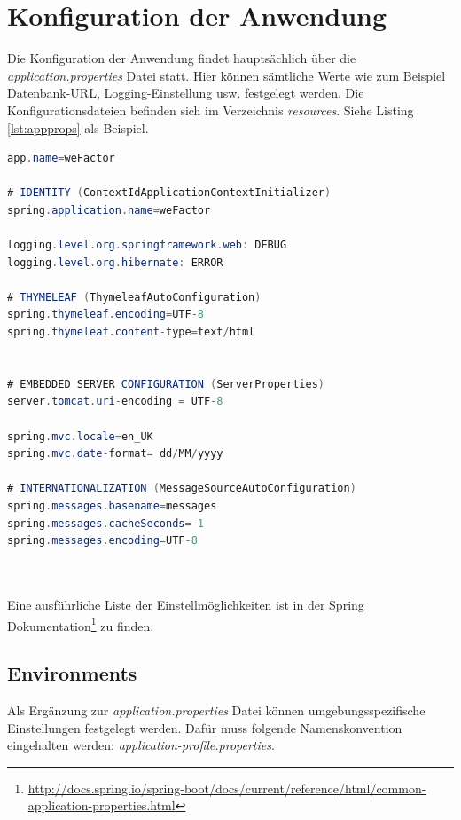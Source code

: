 
\thispagestyle{plain}

\chapter{Konfiguration der Anwendung}\label{c_config}
Die Konfiguration der Anwendung findet hauptsächlich über die \emph{application.properties} Datei statt. Hier können sämtliche Werte wie zum Beispiel Datenbank-URL, Logging-Einstellung usw. festgelegt werden. Die Konfigurationsdateien befinden sich im Verzeichnis \emph{resources}. Siehe Listing \ref{lst:appprops} als Beispiel.

   \begin{lstlisting}[caption={application.properties},label={lst:appprops},language=Java]
app.name=weFactor

# IDENTITY (ContextIdApplicationContextInitializer)
spring.application.name=weFactor

logging.level.org.springframework.web: DEBUG
logging.level.org.hibernate: ERROR

# THYMELEAF (ThymeleafAutoConfiguration)
spring.thymeleaf.encoding=UTF-8
spring.thymeleaf.content-type=text/html


# EMBEDDED SERVER CONFIGURATION (ServerProperties)
server.tomcat.uri-encoding = UTF-8

spring.mvc.locale=en_UK
spring.mvc.date-format= dd/MM/yyyy

# INTERNATIONALIZATION (MessageSourceAutoConfiguration)
spring.messages.basename=messages
spring.messages.cacheSeconds=-1
spring.messages.encoding=UTF-8

    
   \end{lstlisting}
   Eine ausführliche Liste der Einstellmöglichkeiten ist in der Spring Dokumentation\footnote{\url{http://docs.spring.io/spring-boot/docs/current/reference/html/common-application-properties.html}} zu finden.
   
   
\section{Environments}\label{s_env}
Als Ergänzung zur \emph{application.properties} Datei können umgebungsspezifische Einstellungen festgelegt werden. Dafür muss folgende Namenskonvention eingehalten werden: \emph{application-{profile}.properties}.

